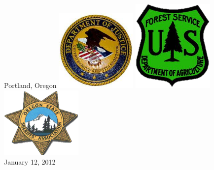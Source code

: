 \begin{frame}{Portland, Oregon}
    \includegraphics[width=0.3\textwidth]{img/doj.png}
    \includegraphics[width=0.3\textwidth]{img/usfs.png}
    \includegraphics[width=0.3\textwidth]{img/ossa.png}
    {   
        \centering
        \\ { \huge January 12, 2012 } \\
    }
\end{frame}

